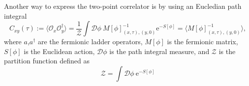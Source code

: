 Another way to express the two-point correlator is by using an Eucledian path integral
\begin{equation}
    C_{xy}(\tau) := \langle \mathcal{O}_x\mathcal{O}^\dagger_y \rangle = \frac{1}{\mathcal{Z}} \int \mathcal{D}\phi \:M[\phi]^{-1}_{(x,\tau),(y,0)}\mathrm{e}^{-S[\phi]} = \langle M[\phi]^{-1}_{(x,\tau),(y,0)} \rangle,
\end{equation}
where $a$,$a^\dagger$ are the fermionic ladder operators, $M[\phi]$ is the fermionic matrix, $S[\phi]$ is the Euclidean action, $\mathcal{D}\phi$ is the path integral measure, and $\mathcal{Z}$ is the partition function defined as
\begin{equation}
    \mathcal{Z} = \int \mathcal{D}\phi \:\mathrm{e}^{-S[\phi]}
\end{equation}



